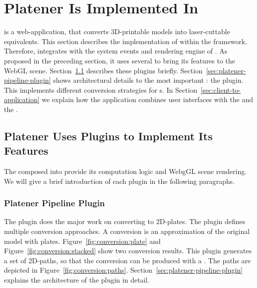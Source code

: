 \documentclass[../ClassicThesis.tex]{subfiles}
\begin{document}


\section{Platener Is Implemented In {\convertify}}
\label{sec:application-platener}


{\platener} is a web-application, that converts 3D-printable
models into laser-cuttable equivalents. This section
describes the implementation of {\platener} within the
{\convertify} framework. Therefore, {\platener} integrates
with the system events and rendering engine of
{\convertify}. As proposed in the preceding section, it uses
several  to bring its features to the WebGL
scene. Section~\ref{sec:platener-uses-plugins} describes
these plugins briefly.
Section~\ref{sec:platener-pipeline-plugin} shows
architectural details to the most important :
the  plugin. This 
implements different conversion strategies for
{\threedmodel}s. In Section~\ref{sec:client-to-application}
we explain how the application combines user interfaces with
the  and the .

\subsection{Platener Uses Plugins to Implement Its Features}
\label{sec:platener-uses-plugins}

The  composed into {\platener} provide its
computation logic and WebgGL scene rendering. We will give a
brief introduction of each plugin in the following
paragraphs.

\subsubsection{Platener Pipeline Plugin}

The  plugin does the major work on
converting {\threedmodels} to 2D-plates. The plugin defines
multiple conversion approaches. A conversion is an
approximation of the original model with plates.
Figure~\ref{fig:conversion:plate} and
Figure~\ref{fig:conversion:stacked} show two conversion
results. This plugin generates a set of 2D-paths, so that
the conversion can be produced with a {\lasercutter}. The
paths are depicted in Figure~\ref{fig:conversion:paths}.
Section~\ref{sec:platener-pipeline-plugin} explains the
architecture of the  plugin in
detail.
\end{document}
